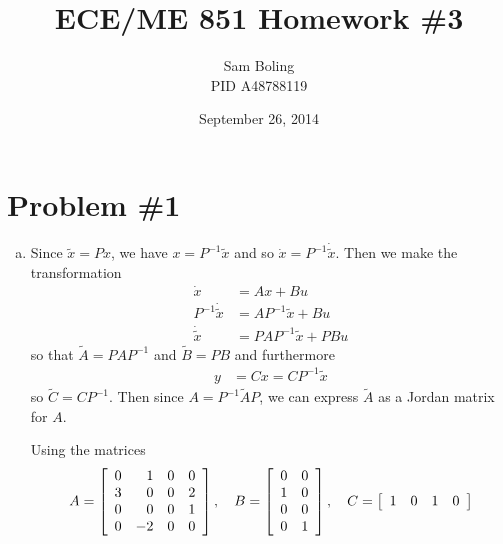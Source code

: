 \documentclass{article}
\title{ECE/ME 851 Homework \#3}
\date{September 26, 2014}
\author{Sam Boling \\ PID A48788119}
\begin{document}
\maketitle

\section*{Problem \#1}
\begin{enumerate}[(a)]
\item{
Since $\tilde{x} = P x$, we have
$x = P^{-1} \tilde{x}$ and so
$\dot{x} = P^{-1} \dot{\tilde{x}}$.
Then we make the transformation
\begin{align*}
\dot{x} &= A x + B u \\
P^{-1}\dot{\tilde{x}} &= A P^{-1} \tilde{x} + B u \\
\dot{\tilde{x}} &= P A P^{-1} \tilde{x} + P B u
\end{align*}
so that $\tilde{A} = P A P^{-1}$ and $\tilde{B} = P B$ and furthermore
\begin{align*}
  y &= C x = C P^{-1} \tilde{x}
\end{align*}
so $\tilde{C} = C P^{-1}$. Then since $A = P^{-1} \tilde{A} P$, we can
express $\tilde{A}$ as a Jordan matrix for $A$.

Using the matrices
$$
  A =
  \left[\begin{array}{r r r r}
     0 &  1 &  0 &  0 \\
     3 &  0 &  0 &  2 \\
     0 &  0 &  0 &  1 \\
     0 & -2 &  0 &  0
  \end{array}\right], \quad
  B =
  \left[\begin{array}{c c}
     0 &  0 \\
     1 &  0 \\
     0 &  0 \\
     0 &  1 
  \end{array}\right], \quad
  C =
  \left[\begin{array}{c c c c}
     1 &  0 &  1 &  0
  \end{array}\right]
$$

}
\end{enumerate}
\end{document}
